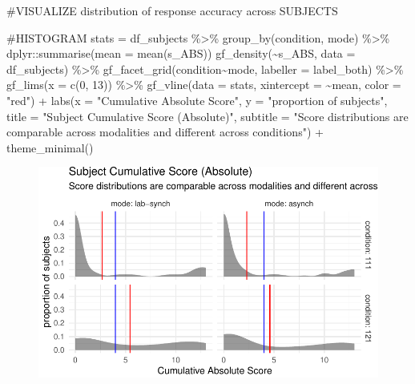 \documentclass[
  letterpaper,
  DIV=11,
  numbers=noendperiod]{scrreprt}
\newenvironment{Shaded}{\begin{snugshade}}{\end{snugshade}}
\newcommand{\AttributeTok}[1]{\textcolor[rgb]{0.40,0.45,0.13}{#1}}
\newcommand{\CommentTok}[1]{\textcolor[rgb]{0.37,0.37,0.37}{#1}}
\newcommand{\DecValTok}[1]{\textcolor[rgb]{0.68,0.00,0.00}{#1}}
\newcommand{\FunctionTok}[1]{\textcolor[rgb]{0.28,0.35,0.67}{#1}}
\newcommand{\NormalTok}[1]{\textcolor[rgb]{0.00,0.23,0.31}{#1}}
\newcommand{\OtherTok}[1]{\textcolor[rgb]{0.00,0.23,0.31}{#1}}
\newcommand{\SpecialCharTok}[1]{\textcolor[rgb]{0.37,0.37,0.37}{#1}}
\newcommand{\StringTok}[1]{\textcolor[rgb]{0.13,0.47,0.30}{#1}}
\begin{document}
\begin{Shaded}
\begin{Highlighting}[]
\CommentTok{\#VISUALIZE distribution of response accuracy across SUBJECTS}

\CommentTok{\#HISTOGRAM}
\NormalTok{stats }\OtherTok{=}\NormalTok{ df\_subjects }\SpecialCharTok{\%\textgreater{}\%} \FunctionTok{group\_by}\NormalTok{(condition, mode) }\SpecialCharTok{\%\textgreater{}\%}\NormalTok{ dplyr}\SpecialCharTok{::}\FunctionTok{summarise}\NormalTok{(}\AttributeTok{mean =} \FunctionTok{mean}\NormalTok{(s\_ABS))}
\FunctionTok{gf\_density}\NormalTok{(}\SpecialCharTok{\textasciitilde{}}\NormalTok{s\_ABS, }\AttributeTok{data =}\NormalTok{ df\_subjects) }\SpecialCharTok{\%\textgreater{}\%} 
  \FunctionTok{gf\_facet\_grid}\NormalTok{(condition}\SpecialCharTok{\textasciitilde{}}\NormalTok{mode, }\AttributeTok{labeller =}\NormalTok{ label\_both) }\SpecialCharTok{\%\textgreater{}\%} 
  \FunctionTok{gf\_lims}\NormalTok{(}\AttributeTok{x =} \FunctionTok{c}\NormalTok{(}\DecValTok{0}\NormalTok{, }\DecValTok{13}\NormalTok{)) }\SpecialCharTok{\%\textgreater{}\%} 
  \FunctionTok{gf\_vline}\NormalTok{(}\AttributeTok{data =}\NormalTok{ stats, }\AttributeTok{xintercept =} \SpecialCharTok{\textasciitilde{}}\NormalTok{mean, }\AttributeTok{color =} \StringTok{"red"}\NormalTok{) }\SpecialCharTok{+}
  \FunctionTok{labs}\NormalTok{(}\AttributeTok{x =} \StringTok{"Cumulative Absolute Score"}\NormalTok{,}
       \AttributeTok{y =} \StringTok{"proportion of subjects"}\NormalTok{,}
       \AttributeTok{title =} \StringTok{"Subject Cumulative Score (Absolute)"}\NormalTok{,}
       \AttributeTok{subtitle =} \StringTok{"Score distributions are comparable across modalities and different across conditions"}\NormalTok{) }\SpecialCharTok{+} 
  \FunctionTok{theme\_minimal}\NormalTok{()}
\end{Highlighting}
\end{Shaded}

\begin{figure}[H]

{\centering \includegraphics{analysis/SGC3A/4_sgc3A_hypotesting_files/figure-pdf/VIS-SUBJECT-ABS-1.pdf}

}

\end{figure}
\end{document}
